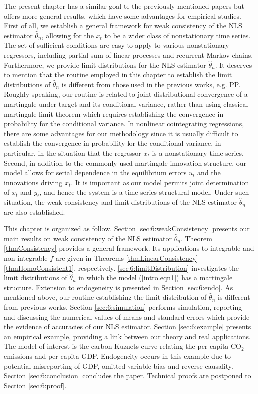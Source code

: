 The present chapter has a similar goal to the previously mentioned papers but offers more general results, which have some advantages for empirical studies. First of all, we establish a general framework for  weak consistency of the NLS estimator $\hat{\theta}_n$, allowing for the $x_t$ to be  a  wider class of nonstationary time series.
 The set of sufficient conditions are easy to apply to various nonstationary regressors, including partial sum of linear processes and recurrent Markov chains. Furthermore, we  provide limit distributions for the NLS estimator $\hat{\theta}_n$. It  deserves to mention that  the routine employed in this chapter to establish the limit distributions of $\hat\theta_n$ is different from those used in the previous works, e.g. PP. Roughly speaking, our routine is related to joint distributional convergence of a martingale under target and its conditional variance, rather than using classical martingale limit theorem which requires establishing the convergence in probability for the conditional variance.  In nonlinear cointegrating regressions, there are   some advantages for our methodology  since it is usually difficult to establish the convergence in probability for the conditional variance, in particular, in the situation that the regressor $x_t$ is a nonstationary time series.
Second, in addition to the commonly used martingale innovation structure, our model allows for serial dependence in the equilibrium errors $u_t$ and the innovations driving $x_t$. It is important as our model  permits joint determination of $x_t$ and $y_t$, and hence the system is a time series structural model. Under such situation, the weak consistency and limit distributions of the NLS estimator $\hat{\theta}_n$ are also established.

This chapter is organized as follow. Section \ref{sec:6:weakConsistency} presents our main results on weak consistency of the NLS estimator $\hat \theta_n$. Theorem \ref{thmConsistency} provides a general framework.  Its applications to integrable and non-integrable $f$  are given in Theorems \ref{thmLinearConsistency}--\ref{thmHomoConsistent1}, respectively.  \ref{sec:6:limitDistribution} investigates the limit distributions of $\hat \theta_n$ in which the model (\ref {intro.eqn1}) has a martingale structure. Extension to endogeneity is presented in Section \ref{sec:6:endo}. As mentioned above, 
our routine establishing the limit distribution of $\hat \theta_n$ is different from previous works. Section \ref{sec:6:simulation} performs simulation,  reporting and discussing the numerical values of means and standard errors which provide the evidence of accuracies of our NLS estimator. Section \ref{sec:6:example} presents  an empirical example,  providing a link between our theory and real applications. The model of interest is the carbon Kuznets curve relating the per capita CO$_2$ emissions and per capita GDP. Endogeneity occurs in this example due to potential misreporting of GDP, omitted variable bias and reverse causality. Section \ref{sec:6:conclusion} concludes the paper. Technical proofs are postponed to Section \ref{sec:6:proof}.

